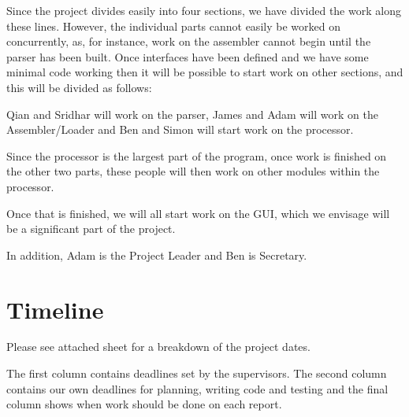 \documentclass[12pt]{report}
\begin{document}
Since the project divides easily into four sections, we have divided the work along these lines.  However, the individual parts cannot easily be worked on concurrently, as, for instance, work on the assembler cannot begin until the parser has been built. Once interfaces have been defined and we have some minimal code working then it will be possible to start work on other sections, and this will be divided as follows:

Qian and Sridhar will work on the parser, James and Adam will work on the Assembler/Loader and Ben and Simon will start work on the processor.

Since the processor is the largest part of the program, once work is finished on the other two parts, these people will then work on other modules within the processor.

Once that is finished, we will all start work on the GUI, which we envisage will be a significant part of the project.

In addition, Adam is the Project Leader and Ben is Secretary.

\chapter{Timeline}

Please see attached sheet for a breakdown of the project dates.

The first column contains deadlines set by the supervisors. The second column contains our own deadlines for planning, writing code and testing and the final column shows when work should be done on each report.
\end{document}
